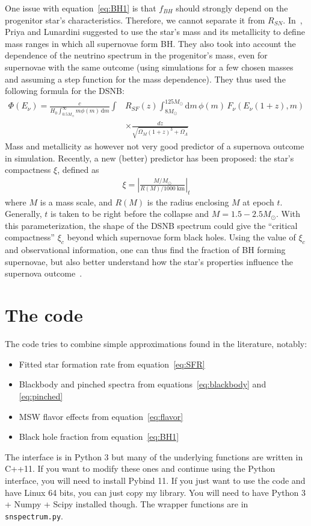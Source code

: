 \documentclass[12pt]{article}
\begin{document}
    One issue with equation~\ref{eq:BH1} is that $f_{BH}$ should strongly depend on the progenitor star's characteristics. Therefore, we cannot separate it from $R_{SN}$. In~\cite{Priya:2017bmm}, Priya and Lunardini suggested to use the star's mass and its metallicity to define mass ranges in which all supernovae form BH. They also took into account the dependence of the neutrino spectrum in the progenitor's mass, even for supernovae with the same outcome (using simulations for a few chosen masses and assuming a step function for the mass dependence). They thus used the following formula for the DSNB: 
    \begin{align}
        \Phi(E_\nu) = \frac{c}{H_0\int_{0.5M_\odot}^\infty m \phi(m)\,\mathrm{d}m}\int & R_{SF}(z)\int_{8M_\odot}^{125M_\odot}\mathrm{d}m\,\phi(m)\,F_{\nu}(E_\nu (1 + z), m) \\
        &\times \frac{dz}{\sqrt{\Omega_M(1+z)^3 + \Omega_\Lambda}}
    \label{eq:BH1}
    \end{align}
    Mass and metallicity as however not very good predictor of a supernova outcome in simulation. Recently, a new (better) predictor has been proposed: the star's compactness $\xi$, defined as
    \begin{align}
    \xi = \left|\frac{M/M_\odot}{R(M)/1000~\mathrm{km}}\right|_t
    \end{align}
    where $M$ is a mass scale, and $R(M)$ is the radius enclosing $M$ at epoch $t$. Generally, $t$ is taken to be right before the collapse and $M = 1.5-2.5M_\odot$. With this parameterization, the shape of the DSNB spectrum could give the ``critical compactness'' $\xi_c$ beyond which supernovae form black holes. Using the value of $\xi_c$ and observational information, one can thus find the fraction of BH forming supernovae, but also better understand how the star's properties influence the supernova outcome~\cite{Horiuchi:2017qja}.
    \section{The code}
    The code tries to combine simple approximations found in the literature, notably:
    \begin{itemize}
        \item Fitted star formation rate from equation~\ref{eq:SFR}
        \item Blackbody and pinched spectra from equations~\ref{eq:blackbody} and \ref{eq:pinched}
        \item MSW flavor effects from equation~\ref{eq:flavor}
        \item Black hole fraction from equation~\ref{eq:BH1}
    \end{itemize}
    The interface is in Python 3 but many of the underlying functions are written in C++11. If you want to modify these ones and continue using the Python interface, you will need to install Pybind 11. If you just want to use the code and have Linux 64 bits, you can just copy my library. You will need to have Python 3 + Numpy + Scipy installed though. The wrapper functions are in \texttt{snspectrum.py}.
\end{document}
